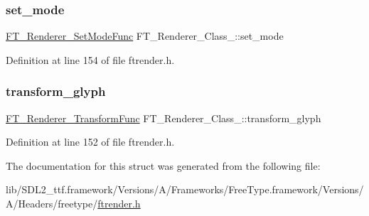 \subsubsection{\texorpdfstring{set\_mode}{set\_mode}}
{\footnotesize\ttfamily \mbox{\hyperlink{ftrender_8h_a7ed568cf54b436823fea2f8a8864854b}{F\+T\+\_\+\+Renderer\+\_\+\+Set\+Mode\+Func}} F\+T\+\_\+\+Renderer\+\_\+\+Class\+\_\+\+::set\+\_\+mode}



Definition at line 154 of file ftrender.\+h.

\mbox{\label{struct_f_t___renderer___class___a2aef09ecdabacf5628ef29fb3d179def}} 
\subsubsection{\texorpdfstring{transform\_glyph}{transform\_glyph}}
{\footnotesize\ttfamily \mbox{\hyperlink{ftrender_8h_ab4503afff651cd78750fd9d3218a9237}{F\+T\+\_\+\+Renderer\+\_\+\+Transform\+Func}} F\+T\+\_\+\+Renderer\+\_\+\+Class\+\_\+\+::transform\+\_\+glyph}



Definition at line 152 of file ftrender.\+h.



The documentation for this struct was generated from the following file\+:\begin{DoxyCompactItemize}
\item 
lib/\+S\+D\+L2\+\_\+ttf.\+framework/\+Versions/\+A/\+Frameworks/\+Free\+Type.\+framework/\+Versions/\+A/\+Headers/freetype/\mbox{\hyperlink{ftrender_8h}{ftrender.\+h}}\end{DoxyCompactItemize}
